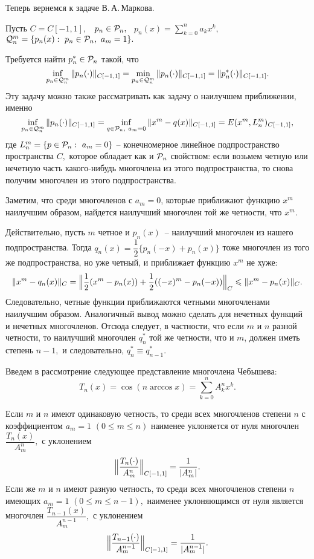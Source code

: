 Теперь вернемся к задаче В.\,А.\,Маркова.

Пусть $C=C[-1,1],$~ $p_n \in {\Cal P}_n,$~ $p_n(x)=\sum\limits_{k=0}^{n}a_kx^k,$~
${\Cal Q}^m_{n}=\{p_n(x):\ p_n\in {\Cal P}_n,\ a_{m}=1\}.$

Требуется найти $p_n^* \in \Cal P_n$
такой, что
\[
  \inf_{p_n \in {\Cal Q}^m_n} \|p_n(\cdot)\|_{C[-1,1]} =
  \min_{p_n \in {\Cal Q}^m_n} \|p_n(\cdot)\|_{C[-1,1]} =
  \|p^*_n(\cdot)\|_{C[-1,1]}.
\]
Эту задачу можно также рассматривать как задачу о
наилучшем приближении, именно
\[
  \inf_{p_n \in {\Cal Q}^m_n} \|p_n(\cdot)\|_{C[-1,1]} =
  \inf_{q \in {\Cal P}_n,\ a_m=0} \|x^m-q(x)\|_{C[-1,1]} =
  E(x^m,L_n^m)_{C[-1,1]},
\]
где $L_n^m=\{p\in {\Cal P}_n:\ a_m=0\}$ -- конечномерное линейное подпространство пространства
$C,$ которое обладает как и ${\Cal P}_n$ свойством: если возьмем
четную или нечетную часть какого-нибудь многочлена из этого
подпространства, то снова получим многочлен из этого подпространства.

Заметим, что среди многочленов {с $a_m=0$}, которые приближают функцию $x^m$
наилучшим образом, {найдется наилучший} многочлен {той же
четности, что} $x^m$.

Действительно, пусть $m$ четное и $p_n(x)$~-- наилучший многочлен из нашего
подпространства. Тогда {$q_n(x)=\dfrac{1}{2}\{p_n(-x)+p_n(x)\}$}
тоже многочлен из того же подпространства, но уже четный, и приближает
{функцию $x^m$} не хуже:
\[
  \|x^m-q_n(x)\|_C=\Bigl\|\frac{1}{2}(x^m-p_n(x))+
                     \frac{1}{2}((-x)^m-p_n(-x))\Bigr\|_C \le
  \|x^m-p_n(x)\|_C.
\]
Следовательно, четные функции приближаются четными
многочленами наилучшим образом. Аналогичный вывод можно сделать для нечетных
функций и нечетных многочленов. Отсюда следует, в частности,
что если $m$ и $n$ разной четности, то наилучший многочлен
{$q_n^*$} той же четности, что и $m$, должен иметь степень
$n-1,$ и следовательно, {$q_n^*\equiv q_{n-1}^*.$}

 Введем в рассмотрение {следующее представление многочлена}
Чебышева:
\[
  T_n(x)=\cos{( n \arccos x)} =\sum\limits_{k=0}^n A_k^nx^k.
\]
\begin{teo}[{В.\,А.\,Марков}]
Если $m$ и $n$ имеют одинаковую четность, то среди всех многочленов степени $n$ с
коэффициентом $a_m=1$ {$(0\le m\le n)$} наименее уклоняется от
нуля многочлен $\dfrac{T_n(x)}{A_m^n},$ с уклонением
\[
  \Bigl\|\frac{T_n(\cdot )}{A_m^n}\Bigr\|_{C[-1,1]}=\frac{1}{|A_m^n|}.
\]
Если же $m$ и $n$ имеют разную четность, то среди всех многочленов степени $n$ имеющих
$a_m=1$ {$(0\le m\le n-1),$} наименее уклоняющимся от нуля является многочлен
$\dfrac{T_{n-1}(x)}{A_m^{n-1}},$ с уклонением
\[
  \Bigl\|\frac{T_{n-1}(\cdot )}{A_m^{n-1}}\Bigr\|_{C[-1,1]}
                                             =\frac{1}{|A_m^{n-1}|}.
\]
\end{teo}

